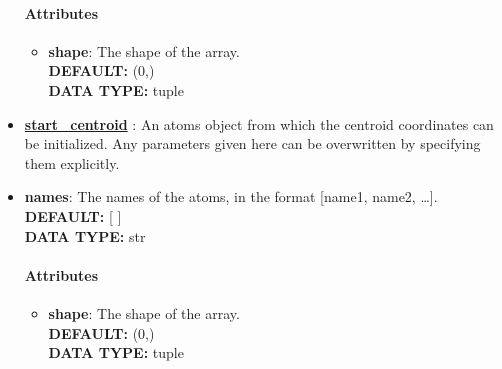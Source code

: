 \begin{itemize}
\paragraph{Attributes}
 \begin{itemize}
\item {\bf shape}:
 The shape of the array.
{\\ \bf DEFAULT: }(0,)
{\\ \bf DATA TYPE: }tuple
\end{itemize}
 
\item {\bf \hyperref[ATOMS]{start\_centroid} }:
 An atoms object from which the centroid coordinates can be initialized. Any parameters given here can be overwritten by specifying them explicitly.
\item {\bf names}:
 The names of the atoms, in the format [name1, name2, \ldots  ].
{\\ \bf DEFAULT: }[ ]
{\\ \bf DATA TYPE: }str
\paragraph{Attributes}
 \begin{itemize}
\item {\bf shape}:
 The shape of the array.
{\\ \bf DEFAULT: }(0,)
{\\ \bf DATA TYPE: }tuple
\end{itemize}
 
\end{itemize}
 
